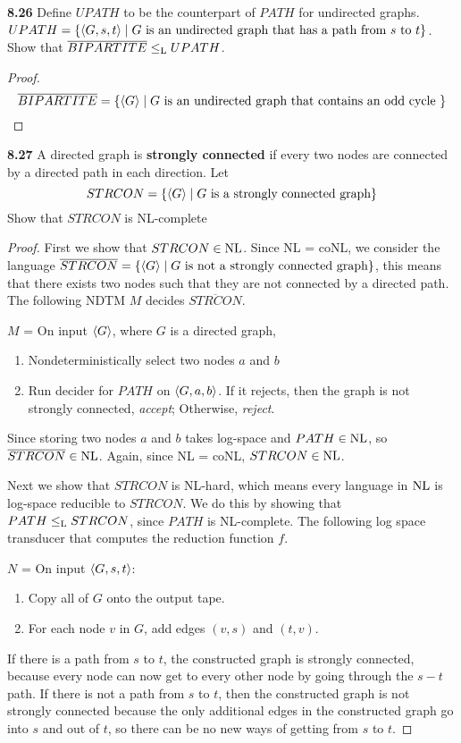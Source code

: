 \textbf{8.26} Define $UPATH$ to be the counterpart of $PATH$ for undirected graphs. 
$UPATH = \{ \langle{G, s, t}\rangle \mid \text{$G$ is an undirected graph that has a path from $s$ to $t$} \}$.
Show that $\overline{BIPARTITE} \leq_{\text{L}} UPATH$.
\begin{mdframed}
\begin{proof}
\[
\overline {BIPARTITE} = \{ \langle{G}\rangle \mid G \text{ is an undirected graph that contains an odd cycle }\}
\]
\end{proof}
\end{mdframed}

\label{lang:STRCON_NLC}
\textbf{8.27} A directed graph is \textbf{strongly connected} if every two nodes are connected by a directed path in each direction. Let 
\[
STRCON = \{\langle{G}\rangle \mid G \text{ is a strongly connected graph} \}
\]
Show that $STRCON$ is NL-complete
\begin{mdframed}
\begin{proof}
First we show that $STRCON \in \text{NL}$. Since NL = coNL, we consider the language $\overline{STRCON} = \{ \langle{G}\rangle \mid G \text{ is not a strongly connected graph}\}$, this means that there exists two nodes such that they are not connected by a directed path. The following NDTM $M$ decides $\overline{STRCON}$.

\medskip
$M$ = On input $\langle{G}\rangle$, where $G$ is a directed graph,
\begin{enumerate}
\item Nondeterministically select two nodes $a$ and $b$
\item Run decider for $PATH$ on $\langle{G, a, b}\rangle$. If it rejects, then the graph is not strongly connected, \textit{accept}; Otherwise, \textit{reject}.
\end{enumerate}

Since storing two nodes $a$ and $b$ takes log-space and $PATH \in \text{NL}$, so $\overline{STRCON} \in \text{NL}$. Again, since NL = coNL, $STRCON \in \text{NL}$.

\medskip
Next we show that $STRCON$ is NL-hard, which means every language in $\text{NL}$ is log-space reducible to $STRCON$. We do this by showing that $PATH \leq_{\text{L}} STRCON$, since $PATH$ is NL-complete. The following log space transducer that computes the reduction function $f$.

\medskip
$N$ = On input $\langle{G, s, t}\rangle$:
\begin{enumerate}
\item Copy all of $G$ onto the output tape.
\item For each node $v$ in $G$, add edges $(v,s)$ and $(t, v)$.
\end{enumerate}

If there is a path from $s$ to $t$, the constructed graph is strongly connected, because every node can now get to every other node by going through the $s-t$ path. If there is not a path from $s$ to $t$, then the constructed graph is not strongly connected because the only additional edges in the constructed graph go into $s$ and out of $t$, so there can be no new ways of getting from $s$ to $t$.
\end{proof}
\end{mdframed}

